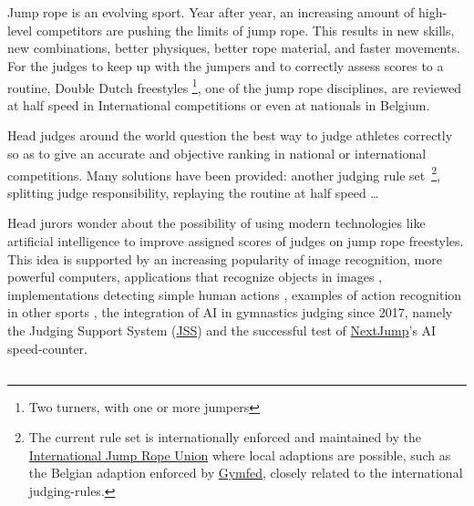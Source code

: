
\chapter{}%
\label{ch:inleiding}

Jump rope is an evolving sport.
Year after year, an increasing amount of high-level competitors are pushing the limits of jump rope.
This results in new skills, new combinations, better physiques, better rope material, and faster movements. For the judges to keep up with the jumpers and to correctly assess scores to a routine, Double Dutch freestyles \footnote{Two turners, with one or more jumpers}, one of the jump rope disciplines, are reviewed at half speed in International competitions or even at nationals in Belgium.

Head judges around the world question the best way to judge athletes correctly so as to give an accurate and objective ranking in national or international competitions.
Many solutions have been provided: another judging rule set~\footnote{The current rule set is internationally enforced and maintained by the \href{https://ijru.sport/}{International Jump Rope Union} where local adaptions are possible, such as the Belgian adaption enforced by \href{https://www.gymfed.be/}{Gymfed}, closely related to the international judging-rules.}, splitting
judge responsibility, replaying the routine at half speed \dots

Head jurors wonder about the possibility of using modern technologies like artificial intelligence to improve assigned scores of judges on jump rope freestyles. This idea is supported by an increasing popularity of image recognition, more powerful computers, applications that recognize objects in images \autocite{Singh_Gill_2022}, implementations detecting simple human actions \autocite{LUQMAN_2022}, examples of action recognition in other sports \autocite{Yin_2024}, the integration of AI in gymnastics judging since 2017, namely the Judging Support System (\href{https://www.gymnastics.sport/site/pages/judges-support.php}{JSS}) and the successful test of \href{https://nextjump.app/}{NextJump}'s AI speed-counter.

\section{}%
\label{sec:probleemstelling}

